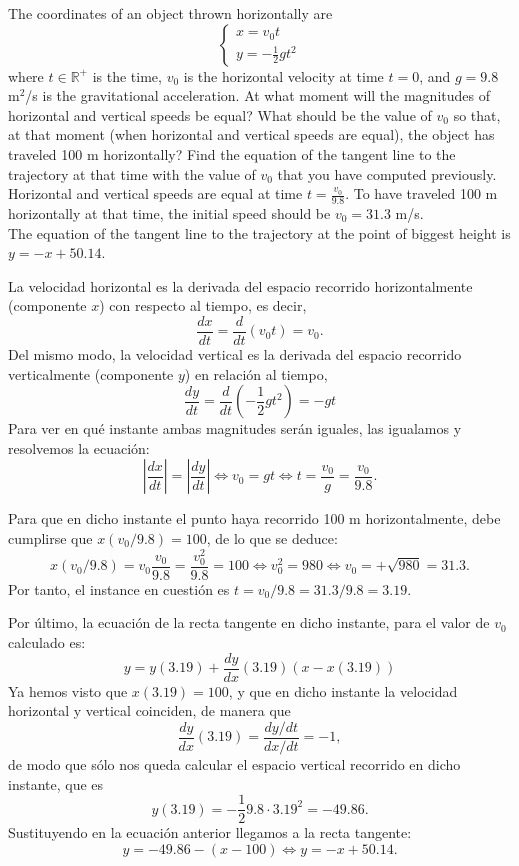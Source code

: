 {The coordinates of an object thrown horizontally are
\[
\begin{cases}
x=v_0t \\
y=-\frac{1}{2}gt^2
\end{cases}
\]
where $t\in \mathbb{R}^{+}$ is the time, $v_0$ is the horizontal velocity at time $t=0$, and $g=9.8$ m$^2$/s is the gravitational acceleration.
At what moment will the magnitudes of horizontal and vertical speeds be equal?
What should be the value of $v_0$ so that, at that moment (when horizontal and vertical speeds are equal), the object has traveled 100 m horizontally?
Find the equation of the tangent line to the trajectory at that time with the value of $v_0$ that you have computed previously.
}
{
Horizontal and vertical speeds are equal at time $ t=\frac{v_0}{9.8}$. To have traveled 100 m horizontally at that time, the initial speed should be $v_0 = 31.3$ m/s.\\
The equation of the tangent line to the trajectory at the point of biggest height is $y =-x+50.14$.
}
{La velocidad horizontal es la derivada del espacio recorrido horizontalmente (componente $x$) con respecto al tiempo, es decir,
\[
\frac{dx}{dt} = \frac{d}{dt}(v_0t)=v_0.
\]
Del mismo modo, la velocidad vertical es la derivada del espacio recorrido verticalmente (componente $y$) en relación al tiempo,
\[
\frac{dy}{dt} = \frac{d}{dt}(-\frac{1}{2}gt^2)=-gt
\]
Para ver en qué instante ambas magnitudes serán iguales, las igualamos y resolvemos la ecuación:
\[
|\frac{dx}{dt}|=|\frac{dy}{dt}| \Leftrightarrow v_0 = gt \Leftrightarrow t=\frac{v_0}{g}=\frac{v_0}{9.8}.
\]

Para que en dicho instante el punto haya recorrido 100 m horizontalmente, debe cumplirse que $x(v_0/9.8)=100$, de lo que se deduce:
\[
x(v_0/9.8)=v_0\frac{v_0}{9.8} = \frac{v_0^2}{9.8}=100 \Leftrightarrow v_0^2 = 980 \Leftrightarrow v_0 = +\sqrt{980}= 31.3.
\]
Por tanto, el instance en cuestión es $t=v_0/9.8= 31.3/9.8 = 3.19$.

Por último, la ecuación de la recta tangente en dicho instante, para el valor de $v_0$ calculado es:
\[
y = y(3.19) + \frac{dy}{dx}(3.19) (x-x(3.19))
\]
Ya hemos visto que $x(3.19)=100$, y que en dicho instante la velocidad horizontal y vertical coinciden, de manera que
\[
\frac{dy}{dx}(3.19)=\frac{dy/dt}{dx/dt}=-1,
\]
de modo que sólo nos queda calcular el espacio vertical recorrido en dicho instante, que es
\[
y(3.19)=-\frac{1}{2}9.8\cdot 3.19^2= -49.86.
\]
Sustituyendo en la ecuación anterior llegamos a la recta tangente:
\[
y = -49.86-(x-100) \Leftrightarrow y=-x+50.14.
\]
}


